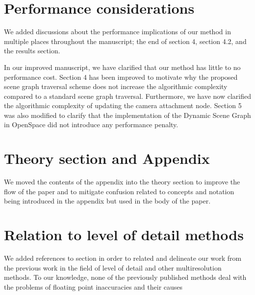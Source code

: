 \documentclass{article}
\begin{document}





\section{Performance considerations}\label{concern:performance}
We added discussions about the performance implications of our method in multiple places
throughout the manuscript;  the end of section 4, section 4.2, and the results section.

In our improved manuscript, we have clarified that our method has little to no performance cost.
Section 4 has been improved to motivate why the proposed scene graph traversal scheme does not increase the algorithmic complexity compared to a standard scene graph traversal.
Furthermore, we have now clarified the algorithmic complexity of updating the camera attachment node.
Section 5 was also modified to clarify that the implementation of the Dynamic Scene Graph in OpenSpace did not introduce any performance penalty.


\section{Theory section and Appendix}\label{concern:structure}
We moved the contents of the appendix into the theory section to improve the flow of the
paper and to mitigate confusion related to concepts and notation being introduced in the
appendix but used in the body of the paper.

\section{Relation to level of detail methods}\label{concern:lod}
We added references to section in order to related and delineate our work from the 
previous work in the field of level of detail and other multiresolution methods. To our
knowledge, none of the previously published methods deal with the problems of floating
point inaccuracies and their causes 
\end{document}
